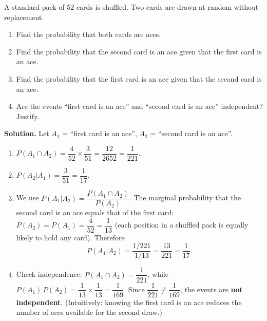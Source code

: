 \documentclass[11pt]{article}
\begin{document}
\begin{exoresolu}
A standard pack of 52 cards is shuffled. Two cards are drawn at random without replacement.
\begin{enumerate}
    \item Find the probability that both cards are aces.
    \item Find the probability that the second card is an ace given that the first card is an ace.
    \item Find the probability that the first card is an ace given that the second card is an ace.
    \item Are the events ``first card is an ace'' and ``second card is an ace'' independent? Justify.
\end{enumerate}
\tcblower
\textbf{Solution.}
Let $A_1$ = ``first card is an ace'', $A_2$ = ``second card is an ace''.
\begin{enumerate}
    \item $P(A_1 \cap A_2) = \dfrac{4}{52} \times \dfrac{3}{51} = \dfrac{12}{2652} = \dfrac{1}{221}$.
    \item $P(A_2|A_1) = \dfrac{3}{51} = \dfrac{1}{17}$.
    \item We use $P(A_1|A_2) = \dfrac{P(A_1 \cap A_2)}{P(A_2)}$. The marginal probability that the second card is an ace equals that of the first card: $P(A_2) = P(A_1) = \dfrac{4}{52} = \dfrac{1}{13}$ (each position in a shuffled pack is equally likely to hold any card). Therefore
    \[
    P(A_1|A_2) = \frac{1/221}{1/13} = \frac{13}{221} = \frac{1}{17}.
    \]
    \item Check independence: $P(A_1 \cap A_2) = \dfrac{1}{221}$, while $P(A_1)\,P(A_2) = \dfrac{1}{13} \times \dfrac{1}{13} = \dfrac{1}{169}$. Since $\dfrac{1}{221} \neq \dfrac{1}{169}$, the events are \textbf{not independent}. (Intuitively: knowing the first card is an ace reduces the number of aces available for the second draw.)
\end{enumerate}
\end{exoresolu}
\end{document}
